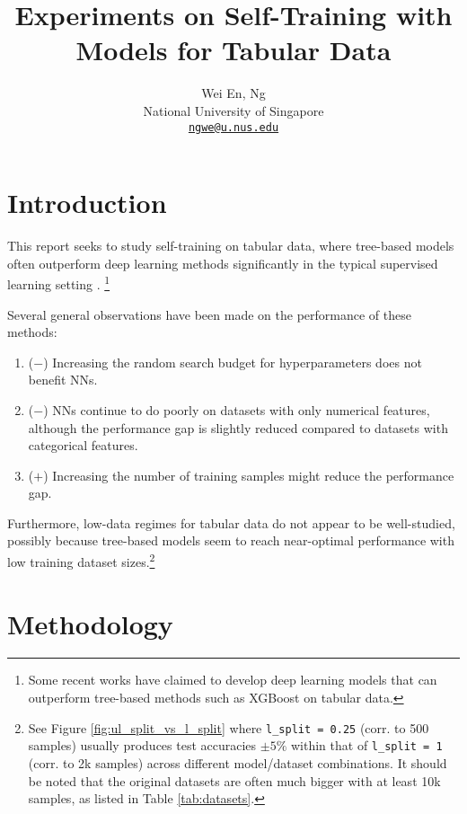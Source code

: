 \documentclass{article}
\title{Experiments on Self-Training with Models for Tabular Data}
\author{
    Wei En, Ng \\
    National University of Singapore \\
    \texttt{\href{mailto:ngwe@u.nus.edu}{ngwe@u.nus.edu}}
}
\begin{document}
\maketitle

\section{Introduction}

This report seeks to study self-training \cite{wei2022theoretical} on tabular data,
where tree-based models often outperform deep learning methods significantly in the
typical supervised learning setting \cite{shwartz-ziv2021tabular,grinsztajn2022why}.%
\footnote{
  Some recent works \cite{gorishniy2023tabr} have claimed to develop deep learning
  models that can outperform tree-based methods such as XGBoost \cite{chen2016xgboost}
  on tabular data.
}

Several general observations have been made on the performance of these methods:
\begin{enumerate}
    \item ($\bm{-}$) Increasing the random search budget for hyperparameters does
    not benefit NNs. \cite{grinsztajn2022why}
    \item ($\bm{-}$) NNs continue to do poorly on datasets with only numerical
    features, although the performance gap is slightly reduced compared to datasets with
    categorical features. \cite{grinsztajn2022why}
    \item ($\bm{+}$) Increasing the number of training samples might reduce the
    performance gap. \cite{grinsztajn2022why}
\end{enumerate}

Furthermore, low-data regimes for tabular data do not appear to be well-studied,
possibly because tree-based models seem to reach near-optimal performance with low
training dataset sizes.\footnote{
  See Figure \ref{fig:ul_split_vs_l_split} where \texttt{l\_split
  = 0.25} (corr. to 500 samples) usually produces test accuracies $\pm 5\%$ within that
  of \texttt{l\_split = 1} (corr. to 2k samples) across different model/dataset
  combinations.
  It should be noted that the original datasets are often much bigger with at least 10k
  samples, as listed in Table \ref{tab:datasets}.
}

\section{Methodology}\label{sec:met}
\end{document}
